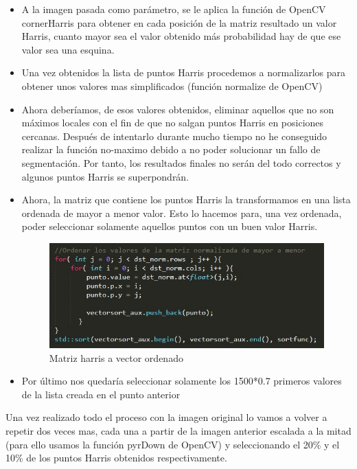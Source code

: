 \begin{itemize}
	\item A la imagen pasada como parámetro, se le aplica la función de OpenCV cornerHarris para obtener en cada posición de la matriz resultado un valor Harris, cuanto mayor sea el valor obtenido más probabilidad hay de que ese valor sea una esquina.
	
	\item Una vez obtenidos la lista de puntos Harris procedemos a normalizarlos para obtener unos valores mas simplificados (función normalize de OpenCV)
	
	\item Ahora deberíamos, de esos valores obtenidos, eliminar aquellos que no son máximos locales con el fin de que no salgan puntos Harris en posiciones cercanas. Después de intentarlo durante mucho tiempo no he conseguido realizar la función no-maximo debido a no poder solucionar un fallo de segmentación. Por tanto, los resultados finales no serán del todo correctos y algunos puntos Harris se superpondrán.
	
	\item Ahora, la matriz que contiene los puntos Harris la transformamos en una lista ordenada de mayor a menor valor. Esto lo hacemos para, una vez ordenada, poder seleccionar solamente aquellos puntos con un buen valor Harris.
	
	\begin{figure}[H]
\centering
\includegraphics[width=0.7\linewidth]{matrizTovector}
\caption{Matriz harris a vector ordenado}
\end{figure}

	
	\item Por último nos quedaría seleccionar solamente los 1500*0.7 primeros valores de la lista creada en el punto anterior
	
\end{itemize}

Una vez realizado todo el proceso con la imagen original lo vamos a volver a repetir dos veces mas, cada una a partir de la imagen anterior escalada a la mitad (para ello usamos la función pyrDown de OpenCV) y seleccionando el 20\% y el 10\% de los puntos Harris obtenidos respectivamente.\\ 

